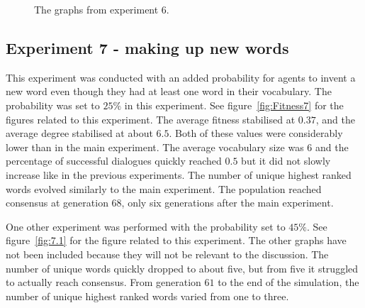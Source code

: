 \begin{figure}[htbp]
    \par \bigskip
    \caption{The graphs from experiment 6.}
    \label{fig:Fitness6}
\end{figure}

\clearpage
\subsection{Experiment 7 - making up new words}
This experiment was conducted with an added probability for agents to invent a new word even though they had at least one word in their vocabulary. The probability was set to $25\%$ in this experiment. See figure~\ref{fig:Fitness7} for the figures related to this experiment. The average fitness stabilised at $0.37$, and the average degree stabilised at about $6.5$. Both of these values were considerably lower than in the main experiment. The average vocabulary size was $6$ and the percentage of successful dialogues quickly reached $0.5$ but it did not slowly increase like in the previous experiments. The number of unique highest ranked words evolved similarly to the main experiment. The population reached consensus at generation $68$, only six generations after the main experiment. 

One other experiment was performed with the probability set to $45\%$. See figure~\ref{fig:7.1} for the figure related to this experiment. The other graphs have not been included because they will not be relevant to the discussion. The number of unique words quickly dropped to about five, but from five it struggled to actually reach consensus. From generation $61$ to the end of the simulation, the number of unique highest ranked words varied from one to three.  

